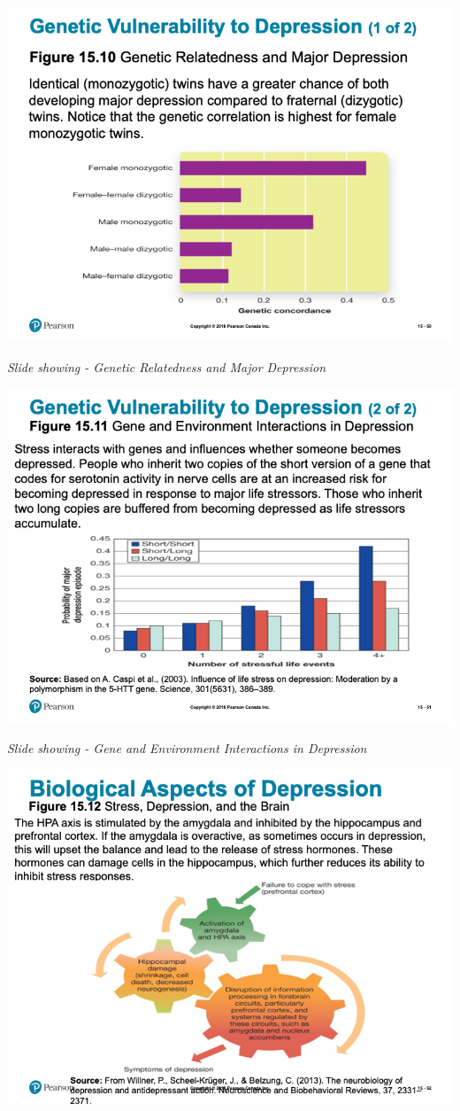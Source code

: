 \documentclass[
]{book}
\begin{document}
\begin{reflect}
\includegraphics{assets/unit_10/slide_50.png}

\emph{Slide showing - Genetic Relatedness and Major Depression}

\includegraphics{assets/unit_10/slide_51.png}

\emph{Slide showing - Gene and Environment Interactions in Depression}

\includegraphics{assets/unit_10/slide_52.png}


\end{reflect}
\end{document}
